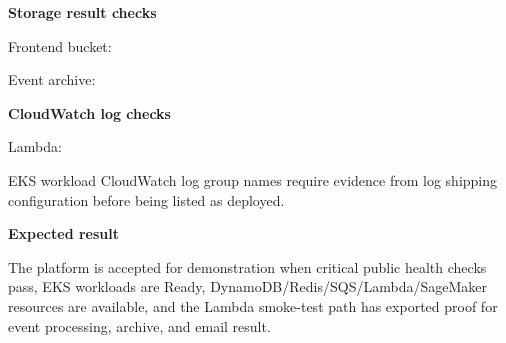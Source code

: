 \vspace{0.5em}\noindent\textbf{Storage result checks}\par

Frontend bucket:

\begin{Shaded}
\begin{Highlighting}[]
\OperatorTok{\textless{}}\OperatorTok{\textgreater{}}\NormalTok{/ }
\end{Highlighting}
\end{Shaded}

Event archive:

\begin{Shaded}
\begin{Highlighting}[]
\OperatorTok{\textless{}}\OperatorTok{\textgreater{}}
\end{Highlighting}
\end{Shaded}

\vspace{0.5em}\noindent\textbf{CloudWatch log checks}\par

Lambda:

\begin{Shaded}
\begin{Highlighting}[]
\end{Highlighting}
\end{Shaded}

EKS workload CloudWatch log group names require evidence from log
shipping configuration before being listed as deployed.

\vspace{0.5em}\noindent\textbf{Expected result}\par

The platform is accepted for demonstration when critical public health
checks pass, EKS workloads are Ready,
DynamoDB/Redis/SQS/Lambda/SageMaker resources are available, and the
Lambda smoke-test path has exported proof for event processing, archive,
and email result.

